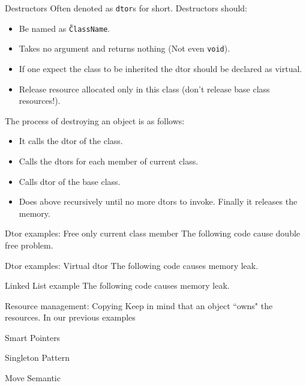 \begin{frame}{Destructors}
Often denoted as \texttt{dtor}s for short. Destructors should:
\begin{itemize}
\item Be named as \texttt{\~ClassName}.
\item Takes no argument and returns nothing (Not even \texttt{void}).
\item If one expect the class to be inherited the dtor should be declared as virtual.
\item Release resource allocated only in this class (don't release base class resources!).
\end{itemize}
The process of destroying an object is as follows:
\begin{itemize}
\item It calls the dtor of the class.
\item Calls the dtors for each member of \alert{current} class.
\item Calls dtor of the base class.
\item Does above recursively until no more dtors to invoke. Finally it releases the memory.
\end{itemize}
\end{frame}

\begin{frame}[fragile]{Dtor examples: Free only current class member}
The following code cause double free problem.
\end{frame}

\begin{frame}[fragile]{Dtor examples: Virtual dtor}
The following code causes memory leak.
\end{frame}

\begin{frame}[fragile]{Linked List example}
The following code causes memory leak.
\end{frame}

\begin{frame}[fragile]{Resource management: Copying}
Keep in mind that an object ``owns" the resources. In our previous examples 
\end{frame}

\begin{frame}{Smart Pointers}
\end{frame}

\begin{frame}{Singleton Pattern}
\end{frame}

\begin{frame}{Move Semantic}
\end{frame}